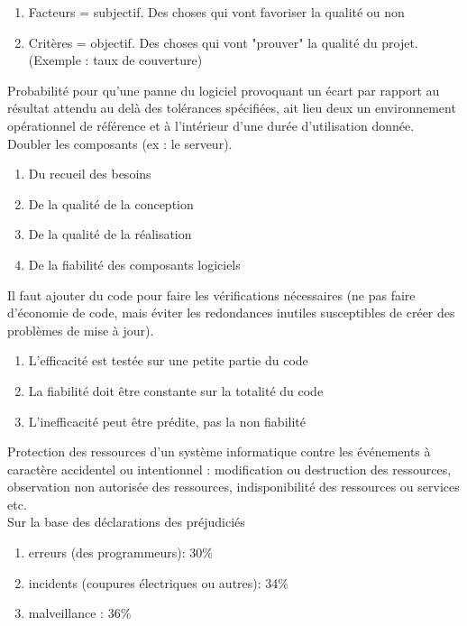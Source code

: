 \begin{enumerate}
	\item Facteurs = subjectif. Des choses qui vont favoriser la qualité ou non
	\item Critères = objectif. Des choses qui vont "prouver" la qualité du projet. (Exemple : taux de couverture)
\end{enumerate}

 Probabilité pour qu'une panne du logiciel provoquant un écart par rapport au résultat attendu au delà des tolérances spécifiées, ait lieu deux un environnement opérationnel de référence et à l'intérieur d'une durée d'utilisation donnée. \\

 Doubler les composants (ex : le serveur).\\

\begin{enumerate}
	\item Du recueil des besoins
	\item De la qualité de la conception
	\item De la qualité de la réalisation
	\item De la fiabilité des composants logiciels
\end{enumerate}

 Il faut ajouter du code pour faire les vérifications nécessaires (ne pas faire d'économie de code, mais éviter les redondances inutiles susceptibles de créer des problèmes de mise à jour).
\begin{enumerate}
	\item L'efficacité est testée sur une petite partie du code
	\item La fiabilité doit être constante sur la totalité du code
	\item L'inefficacité peut être prédite, pas la non fiabilité
\end{enumerate}

 Protection des ressources d'un système informatique contre les événements à caractère accidentel ou intentionnel : modification ou destruction des ressources, observation non autorisée des ressources, indisponibilité des ressources ou services etc. \\

 Sur la base des déclarations des préjudiciés
\begin{enumerate}
	\item erreurs (des programmeurs): 30\%
	\item incidents (coupures électriques ou autres): 34\%
	\item malveillance : 36\%
\end{enumerate}

